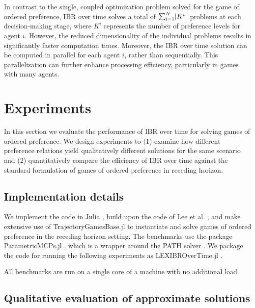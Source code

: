 In contrast to the single, coupled optimization problem solved
for the game of ordered preference, IBR over time solves
a total of \(\sum_{i=1}^{N} \lvert K^i\rvert\) problems at each decision-making stage,
where \(K^i\) represents the number of preference levels for agent \(i\).
However, the reduced dimensionality of the individual problems results
in significantly faster computation times.
Moreover, the IBR over time solution can be computed in parallel for each agent \(i\),
rather than sequentially.
This parallelization can further enhance processing efficiency, particularly in games with many agents.

\section{Experiments}

In this section we evaluate the performance of IBR over time
for solving games of ordered preference. 
We design experiments to (1) examine how different preference relations
yield qualitatively different solutions for the same scenario
and (2) quantitatively compare the efficiency of IBR over time
against the standard formulation of games of ordered preference
in receding horizon.

\subsection{Implementation details}

We implement the code
in Julia \cite{julia}, build upon the code
of Lee et al. \cite{lee:2025},
and make extensive use of TrajectoryGamesBase.jl \cite{peters:tgb:2025}
to instantiate and solve games
of ordered preference
in the receding horizon setting.
The benchmarks use the package ParametricMCPs.jl \cite{peters:2025},
which is a wrapper around the PATH solver \cite{dirkse:1995}.
We package the code
for running the following experiments as LEXIBROverTime.jl \cite{code}.

All benchmarks are run on a single core
of a machine with no additional load.

\subsection{Qualitative evaluation of approximate solutions}

